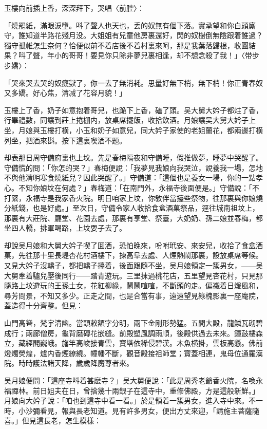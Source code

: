 玉樓向前插上香，深深拜下，哭唱〈前腔〉：

\begin{myquote}
「燒罷紙，滿眼淚墮。呌了聲人也天也，丢的奴無有個下落。實承望和你白頭廝守，誰知道半路花殘月没。大姐姐有兒童他房裏還好，閃的奴樹倒無陰跟着誰過？獨守孤帷怎生奈何？恰便似前不着店後不着村裏來呵，那是我葉落歸根，收圓結果？呌了聲，年小的哥哥！要見你只除非夢兒裏相逢，却不想念殺了我！」{\marktext\small〈带步步嬌〉}：

「哭來哭去哭的奴癡獃了，你一去了無消耗。思量好無下梢，無下梢！你正青春奴又多嬌。好心焦，清减了花容月貌！」
\end{myquote}

玉樓上了香，奶子如意抱着哥兒，也跪下上香，磕了頭。吴大舅大妗子都炷了香，行畢禮數，同讓到莊上捲棚内，放桌席擺飯，收拾飲酒。月娘讓吴大舅大妗子上坐，月娘與玉樓打横，小玉和奶子如意兒，同大妗子家使的老姐蘭花，都兩邊打横列坐，把酒來斟。按下這裏喫酒不題。

却表那日周守備府裏也上坟。先是春梅隔夜和守備睡，假推做夢，睡夢中哭醒了。守備慌的問：「你怎的哭？」春梅便說：「我夢見我娘向我哭泣，說養我一場，怎地不與他清明寒食燒紙兒？因此哭醒了。」守備道：「這個也是養女一場，你的一點孝心。不知你娘坟在何處？」春梅道：「在南門外，永福寺後面便是。」守備說：「不打緊，永福寺是我家香火院。明日咱家上坟，你敎伴當擡些祭物，往那裏與你娘燒分紙錢，也是好處。」至次日，守備令家人收拾食盒酒菓祭品，逕往城南祖坟上，那裏有大莊院、廳堂、花園去處，那裏有享堂、祭臺，大奶奶、孫二娘並春梅，都坐四人轎，排軍喝路，上坟耍子去了。

却說吴月娘和大舅大妗子喫了囬酒，恐怕晚來，吩咐玳安、來安兒，收拾了食盒酒菓，先往那十里長堤杏花村酒樓下，揀高阜去處、人煙熱鬧那裏，設放桌席等候。又見大妗子沒轎子，都把轎子擡着，後面跟隨不坐，吴月娘領定一簇男女，——吴大舅牽着驢兒壓後同行——踏青遊玩。三里抹過桃花店，五里望見杏花村，只見那隨路上坟遊玩的王孫士女，花紅柳綠，鬧鬧喧喧，不斷頭的走。偏襯着日煖風和，尋芳問景，不知又多少。正走之間，也是合當有事，遠遠望見綠槐影裏一座庵院，蓋造得十分齊整。但見：

\begin{myquote}
山門高聳，梵宇清幽。當頭敕額字分明，兩下金剛形勢猛。五間大殿，龍鱗瓦砌碧成行；兩廊僧房，龜背磨磚花嵌縫。前殿塑風調雨順，後殿供過去未來。鐘鼓樓森立，藏經閣巍峨。旛竿高峻接青雲，寳塔依稀侵碧漢。木魚横掛，雲板高懸。佛前燈燭熒煌，爐内香煙繚繞。幢幡不斷，觀音殿接祖師堂；寳蓋相連，鬼母位通羅漢院。時時護法諸天降，歲歲降魔尊者來。
\end{myquote}

吴月娘便問：「這座寺呌着甚麽寺？」吴大舅便說：「此是周秀老爺香火院，名喚永福禪林。前日姐夫在日，曾捨幾十兩銀子在這寺中，重修佛殿，方是這般新鮮。」月娘向大妗子說：「咱也到這寺中看一看。」於是領着一簇男女，進入寺中來。不一時，小沙彌看見，報與長老知道。見有許多男女，便出方丈來迎，「請施主菩薩隨喜。」但見這長老，怎生模樣：


